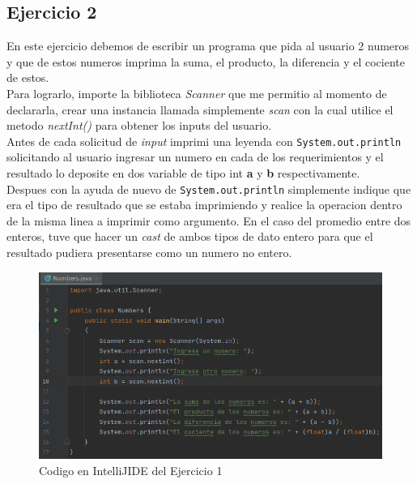\documentclass{article}
\begin{document}
 		\subsection{Ejercicio 2}
 		
 		En este ejercicio debemos de escribir un programa que pida al usuario 2 numeros y que de estos numeros imprima la suma, el producto, la diferencia y el cociente de estos.\\
 		
 		Para lograrlo, importe la biblioteca \emph{Scanner} que me permitio al momento de declararla, crear una instancia llamada simplemente \emph{scan} con la cual utilice el metodo \emph{nextInt()} para obtener los inputs del usuario.\\
 		
 		Antes de cada solicitud de \emph{input} imprimi una leyenda con \verb*|System.out.println| solicitando al usuario ingresar un numero en cada de los requerimientos y el resultado lo deposite en dos variable de tipo int \textbf{a} y \textbf{b} respectivamente.\\
 		
 		Despues con la ayuda de nuevo de \verb*|System.out.println| simplemente indique que era el tipo de resultado que se estaba imprimiendo y realice la operacion dentro de la misma linea a imprimir como argumento. En el caso del promedio entre dos enteros, tuve que hacer un \emph{cast} de ambos tipos de dato entero para que el resultado pudiera presentarse como un numero no entero.
 		
 		\begin{figure}[H]
 			\centering
 			\includegraphics[scale = 0.5]{images/numbers}
 			\caption{Codigo en IntelliJIDE del Ejercicio 1}
 		\end{figure}
 	
\end{document}
